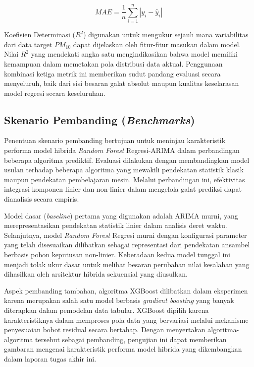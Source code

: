 \newpage

\begin{equation}
MAE = \frac{1}{n} \sum_{i=1}^{n} |y_i - \hat{y}_i|
\label{eq:mae}
\end{equation}

Koefisien Determinasi ($R^2$) digunakan untuk mengukur sejauh mana variabilitas dari data target $PM_{10}$ dapat dijelaskan oleh fitur-fitur masukan dalam model. Nilai $R^2$ yang mendekati angka satu mengindikasikan bahwa model memiliki kemampuan dalam memetakan pola distribusi data aktual. Penggunaan kombinasi ketiga metrik ini memberikan sudut pandang evaluasi secara menyeluruh, baik dari sisi besaran galat absolut maupun kualitas keselarasan model regresi secara keseluruhan.

\subsection{Skenario Pembanding (\textit{Benchmarks})}

Penentuan skenario pembanding bertujuan untuk meninjau karakteristik performa model hibrida \textit{Random Forest} Regresi-ARIMA dalam perbandingan beberapa algoritma prediktif. Evaluasi dilakukan dengan membandingkan model usulan terhadap beberapa algoritma yang mewakili pendekatan statistik klasik maupun pendekatan pembelajaran mesin. Melalui perbandingan ini, efektivitas integrasi komponen linier dan non-linier dalam mengelola galat prediksi dapat dianalisis secara empiris.

Model dasar (\textit{baseline}) pertama yang digunakan adalah ARIMA murni, yang merepresentasikan pendekatan statistik linier dalam analisis deret waktu. Selanjutnya, model \textit{Random Forest} Regresi murni dengan konfigurasi parameter yang telah disesuaikan dilibatkan sebagai representasi dari pendekatan ansambel berbasis pohon keputusan non-linier. Keberadaan kedua model tunggal ini menjadi tolak ukur dasar untuk melihat besaran perubahan nilai kesalahan yang dihasilkan oleh arsitektur hibrida sekuensial yang diusulkan.

Aspek pembanding tambahan, algoritma XGBoost dilibatkan dalam eksperimen karena merupakan salah satu model berbasis \textit{gradient boosting} yang banyak diterapkan dalam pemodelan data tabular. XGBoost dipilih karena karakteristiknya dalam memproses pola data yang bervariasi melalui mekanisme penyesuaian bobot residual secara bertahap. Dengan menyertakan algoritma-algoritma tersebut sebagai pembanding, pengujian ini dapat memberikan gambaran mengenai karakteristik performa model hibrida yang dikembangkan dalam laporan tugas akhir ini.

